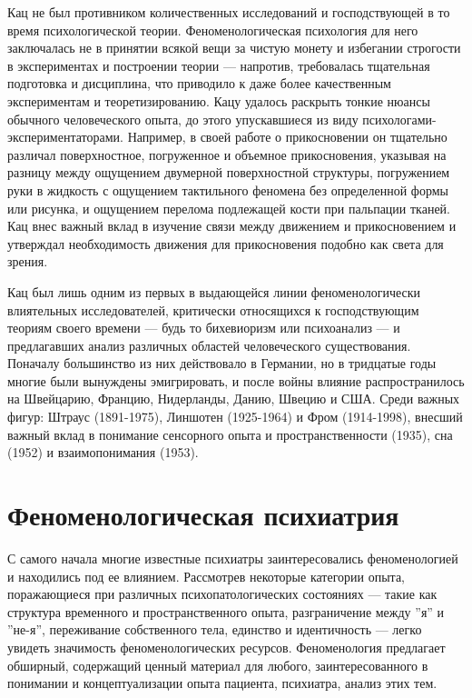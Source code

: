 \documentclass[11pt]{book}
\begin{document}
\relax
{}\relax
\smallskip

Кац не был противником количественных исследований и господствующей в то время психологической теории. Феноменологическая психология для него заключалась не в принятии всякой вещи за чистую монету и избегании строгости в экспериментах и построении теории --- напротив, требовалась тщательная подготовка и дисциплина, что приводило к даже более качественным экспериментам и теоретизированию. Кацу удалось раскрыть тонкие нюансы обычного человеческого опыта, до этого упускавшиеся из виду психологами-экспериментаторами. Например, в своей работе о прикосновении он тщательно различал поверхностное, погруженное и объемное прикосновения, указывая на разницу между ощущением двумерной поверхностной структуры, погружением руки в жидкость с ощущением тактильного феномена без определенной формы или рисунка, и ощущением перелома подлежащей кости при пальпации тканей. Кац внес важный вклад в изучение связи между движением и прикосновением и утверждал необходимость движения для прикосновения подобно как света для зрения.

Кац был лишь одним из первых в выдающейся линии феноменологически влиятельных исследователей, критически относящихся к господствующим теориям своего времени --- будь то бихевиоризм или психоанализ --- и предлагавших анализ различных областей человеческого существования. Поначалу большинство из них действовало в Германии, но в тридцатые годы многие были вынуждены эмигрировать, и после войны влияние распространилось на Швейцарию, Францию, Нидерланды, Данию, Швецию и США. Среди важных фигур: Штраус (1891-1975), Линшотен (1925-1964) и Фром (1914-1998), внесший важный вклад в понимание сенсорного опыта и пространственности (1935), сна (1952) и взаимопонимания (1953).

\section{Феноменологическая психиатрия}

С самого начала многие известные психиатры заинтересовались феноменологией и находились под ее влиянием. Рассмотрев некоторые категории опыта, поражающиеся при различных психопатологических состояниях --- такие как структура временного и пространственного опыта, разграничение между ''я'' и ''не-я'', переживание собственного тела, единство и идентичность --- легко увидеть значимость феноменологических ресурсов. Феноменология предлагает обширный, содержащий ценный материал для любого, заинтересованного в понимании и концептуализации опыта пациента, психиатра, анализ этих тем.
\end{document}
